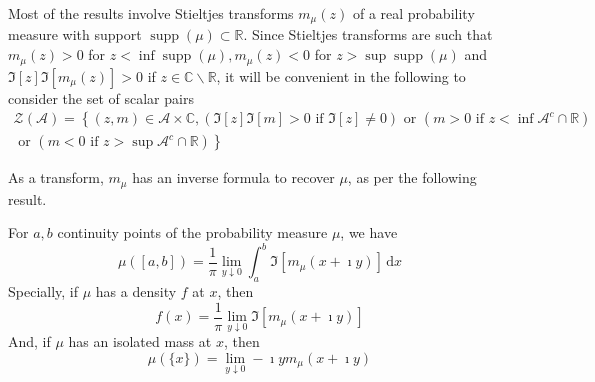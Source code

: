 \begin{remark}
    Most of the results involve Stieltjes transforms $m_{\mu}(z)$ of a real probability measure with support $\operatorname{supp}(\mu) \subset \mathbb{R} .$ Since Stieltjes transforms are such that $m_{\mu}(z)>0$ for $z<\inf \operatorname{supp}(\mu), m_{\mu}(z)<0$ for $z>\sup \operatorname{supp}(\mu)$ and $\Im[z] \Im\left[m_{\mu}(z)\right]>0$ if $z \in \mathbb{C} \backslash \mathbb{R}$, it will be convenient in the following to consider the set of scalar pairs
    \begin{equation*}
        \begin{array}{c}
            \mathcal{Z}(\mathcal{A})=\left\{(z,m)\in\mathcal{A}\times\mathbb{C},(\Im[z]\Im[m]>0\text{ if } \Im[z] \neq 0)\text{ or }\left(m>0\text{ if }z<\inf \mathcal{A}^{c} \cap \mathbb{R}\right)\right. \\
            \left.\text{ or }\left(m<0\text{ if }z>\sup \mathcal{A}^{c} \cap \mathbb{R}\right)\right\}
        \end{array}
    \end{equation*}
\end{remark}

As a transform, $m_{\mu}$ has an inverse formula to recover $\mu$, as per the following result.

\begin{theorem} \label{thm:inverse-stieltjes-transform}
    For $a,b$ continuity points of the probability measure $\mu$, we have
    \begin{equation}
        \mu\left([a,b]\right)=\frac{1}{\pi}\lim_{y\downarrow 0}\int_{a}^{b}\Im\left[m_{\mu}(x+\imath y)\right]\,\mathrm{d}x
    \end{equation}
    Specially, if $\mu$ has a density $f$ at $x$, then
    \begin{equation}
        f(x)=\frac{1}{\pi}\lim_{y\downarrow 0}\Im\left[m_{\mu}(x+\imath y)\right]
    \end{equation}
    And, if $\mu$ has an isolated mass at $x$, then
    \begin{equation}
        \mu(\{x\})=\lim_{y \downarrow 0}-\imath y m_{\mu}(x+\imath y)
    \end{equation}
\end{theorem}

